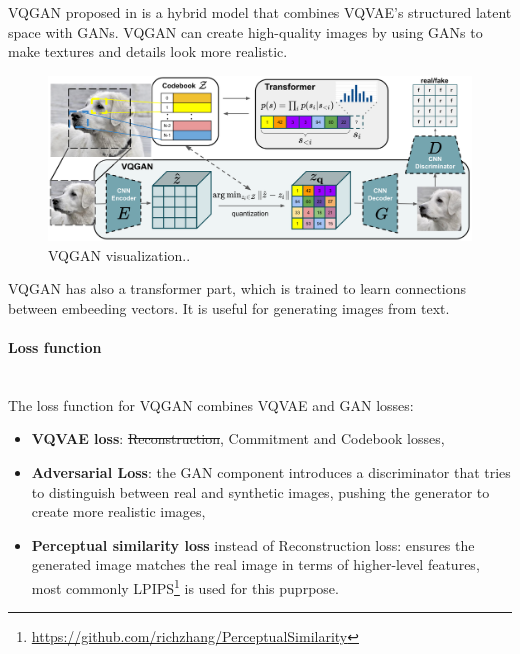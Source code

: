 VQGAN proposed in \cite{Esser_2021_CVPR} is a hybrid model that combines VQVAE's structured latent space with GANs. VQGAN can create high-quality images by using GANs to make textures and details look more realistic.

\begin{figure}[H]
    \centering
    \includegraphics[width=0.9\linewidth]{concept_engineering/vqgan/vqgan.png}
    \caption{VQGAN visualization.\cite{Esser_2021_CVPR}. }
    \label{fig:vqgan-diagram}
\end{figure}

VQGAN has also a transformer part, which is trained to learn connections between embeeding vectors. It is useful for generating images from text.
\paragraph{Loss function}\mbox{}\\

The loss function for VQGAN combines VQVAE and GAN losses:

\begin{itemize}
    \item \textbf{VQVAE loss}: \sout{Reconstruction}, Commitment and Codebook losses,
    \item \textbf{Adversarial Loss}: the GAN component introduces a discriminator that tries to distinguish between real and synthetic images, pushing the generator to create more realistic images,
    \item \textbf{Perceptual similarity loss} instead of Reconstruction loss: ensures the generated image matches the real image in terms of higher-level features, most commonly LPIPS\footnote{\url{https://github.com/richzhang/PerceptualSimilarity}} is used for this puprpose.
\end{itemize}


